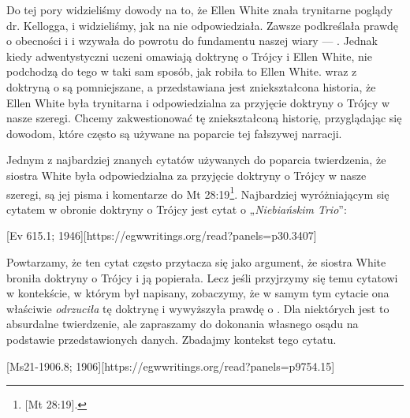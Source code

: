 
Do tej pory widzieliśmy dowody na to, że Ellen White znała trynitarne poglądy dr. Kellogga, i widzieliśmy, jak na nie odpowiedziała. Zawsze podkreślała prawdę o obecności i  i wzywała do powrotu do fundamentu naszej wiary — . Jednak kiedy adwentystyczni uczeni omawiają doktrynę o Trójcy i Ellen White, nie podchodzą do tego w taki sam sposób, jak robiła to Ellen White.  wraz z doktryną o  są pomniejszane, a przedstawiana jest zniekształcona historia, że Ellen White była trynitarna i odpowiedzialna za przyjęcie doktryny o Trójcy w nasze szeregi. Chcemy zakwestionować tę zniekształconą historię, przyglądając się dowodom, które często są używane na poparcie tej fałszywej narracji.

Jednym z najbardziej znanych cytatów używanych do poparcia twierdzenia, że siostra White była odpowiedzialna za przyjęcie doktryny o Trójcy w nasze szeregi, są jej pisma i komentarze do Mt 28:19\footnote{[Mt 28:19].}. Najbardziej wyróżniającym się cytatem w obronie doktryny o Trójcy jest cytat o „\textit{Niebiańskim Trio}”:

[Ev 615.1; 1946][https://egwwritings.org/read?panels=p30.3407]

Powtarzamy, że ten cytat często przytacza się jako argument, że siostra White broniła doktryny o Trójcy i ją popierała. Lecz jeśli przyjrzymy się temu cytatowi w kontekście, w którym był napisany, zobaczymy, że w samym tym cytacie ona właściwie \textit{odrzuciła} tę doktrynę i wywyższyła prawdę o . Dla niektórych jest to absurdalne twierdzenie, ale zapraszamy do dokonania własnego osądu na podstawie przedstawionych danych. Zbadajmy kontekst tego cytatu.

[Ms21-1906.8; 1906][https://egwwritings.org/read?panels=p9754.15]

